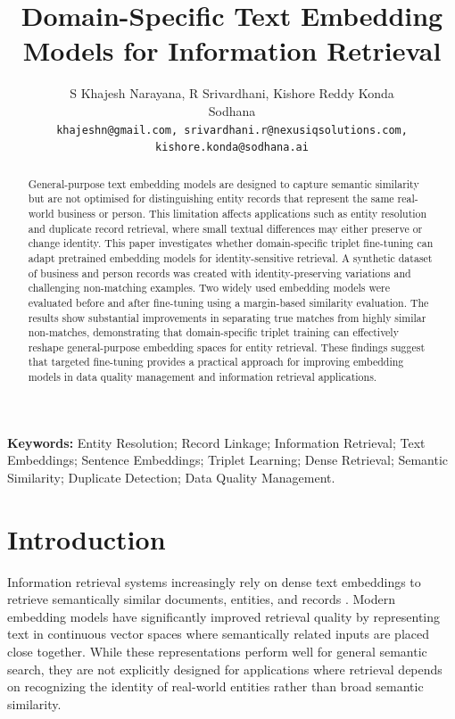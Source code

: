 \documentclass{article}
\title{Domain-Specific Text Embedding Models for Information Retrieval}
\author{%
  S Khajesh Narayana, R Srivardhani, Kishore Reddy Konda \\
  Sodhana \\
  \texttt{khajeshn@gmail.com, srivardhani.r@nexusiqsolutions.com, kishore.konda@sodhana.ai}
}
\begin{document}
\maketitle

\begin{abstract}
General-purpose text embedding models are designed to capture semantic similarity but are not optimised for distinguishing entity records that represent the same real-world business or person. This limitation affects applications such as entity resolution and duplicate record retrieval, where small textual differences may either preserve or change identity. This paper investigates whether domain-specific triplet fine-tuning can adapt pretrained embedding models for identity-sensitive retrieval. A synthetic dataset of business and person records was created with identity-preserving variations and challenging non-matching examples. Two widely used embedding models were evaluated before and after fine-tuning using a margin-based similarity evaluation. The results show substantial improvements in separating true matches from highly similar non-matches, demonstrating that domain-specific triplet training can effectively reshape general-purpose embedding spaces for entity retrieval. These findings suggest that targeted fine-tuning provides a practical approach for improving embedding models in data quality management and information retrieval applications.
\end{abstract}

\textbf{Keywords:} Entity Resolution; Record Linkage; Information Retrieval; Text Embeddings; Sentence Embeddings; Triplet Learning; Dense Retrieval; Semantic Similarity; Duplicate Detection; Data Quality Management.

\section{Introduction}
\label{sec:intro}

Information retrieval systems increasingly rely on dense text embeddings to retrieve semantically similar documents, entities, and records \citep{reimers2019,karpukhin2020}. Modern embedding models have significantly improved retrieval quality by representing text in continuous vector spaces where semantically related inputs are placed close together. While these representations perform well for general semantic search, they are not explicitly designed for applications where retrieval depends on recognizing the identity of real-world entities rather than broad semantic similarity.
\end{document}
